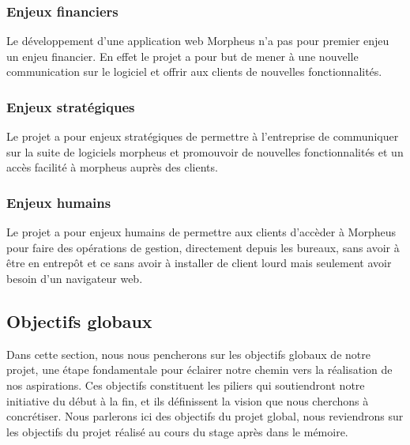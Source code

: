 \documentclass[a4paper, 12pt, french]{article}
\begin{document}
					\subsubsection{Enjeux financiers}
						Le développement d'une application web Morpheus n'a pas pour premier enjeu un enjeu financier. En effet le projet a pour but de mener à une nouvelle communication sur le logiciel et offrir aux clients de nouvelles fonctionnalités.

	
					\subsubsection{Enjeux stratégiques}
						Le projet a pour enjeux stratégiques de permettre à l'entreprise de communiquer sur la suite de logiciels morpheus et promouvoir de nouvelles fonctionnalités et un accès facilité à morpheus auprès des clients.

					\subsubsection{Enjeux humains}
						Le projet a pour enjeux humains de permettre aux clients d'accèder à Morpheus pour faire des opérations de gestion, directement depuis les bureaux, sans avoir à être en entrepôt et ce sans avoir à installer de client lourd mais seulement avoir besoin d'un navigateur web.

				
				\subsection{Objectifs globaux}
					Dans cette section, nous nous pencherons sur les objectifs globaux de notre projet, une étape fondamentale pour éclairer notre chemin vers la réalisation de nos aspirations. Ces objectifs constituent les piliers qui soutiendront notre initiative du début à la fin, et ils définissent la vision que nous cherchons à concrétiser. Nous parlerons ici des objectifs du projet global, nous reviendrons sur les objectifs du projet réalisé au cours du stage après dans le mémoire.\\
\end{document}
